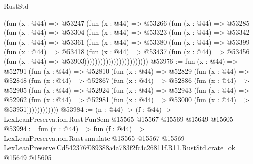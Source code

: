 \begin{lexlean}{RustStd}
\begin{coremodule}
                          (fun (x : @44) =>
                          @53247
                            (fun (x : @44) =>
                            @53266
                              (fun (x : @44) =>
                              @53285
                                (fun (x : @44) =>
                                @53304
                                  (fun (x : @44) =>
                                  @53323
                                    (fun (x : @44) =>
                                    @53342
                                      (fun (x : @44) =>
                                      @53361
                                        (fun (x : @44) =>
                                        @53380
                                          (fun (x : @44) =>
                                          @53399
                                            (fun (x : @44) =>
                                            @53418
                                              (fun (x : @44) =>
                                              @53437
                                                (fun (x : @44) =>
                                                @53456
                                                  (fun (x : @44) => @53903))))))))))))))))))))))))
@53976 := fun (x : @44) =>
  @52791
    (fun (x : @44) =>
    @52810
      (fun (x : @44) =>
      @52829
        (fun (x : @44) =>
        @52848
          (fun (x : @44) =>
          @52867
            (fun (x : @44) =>
            @52886
              (fun (x : @44) =>
              @52905
                (fun (x : @44) =>
                @52924
                  (fun (x : @44) =>
                  @52943
                    (fun (x : @44) =>
                    @52962
                      (fun (x : @44) =>
                      @52981 (fun (x : @44) => @53000 (fun (x : @44) => @53951))))))))))))
@53984 := (n : @44) ->
  (f : @44) -> LexLeanPreservation.Rust.FunSem @15565 @15567 @15569 @15649 @15605
@53994 := fun (n : @44) =>
  fun (f : @44) =>
  LexLeanPreservation.Rust.simulate
    @15565
    @15567
    @15569
    LexLeanPreserve.Cd542376f089388a4a783f2fc4c26811f.R11.RustStd.crate_ok
    @15649
    @15605
\end{coremodule}
\end{lexlean}
